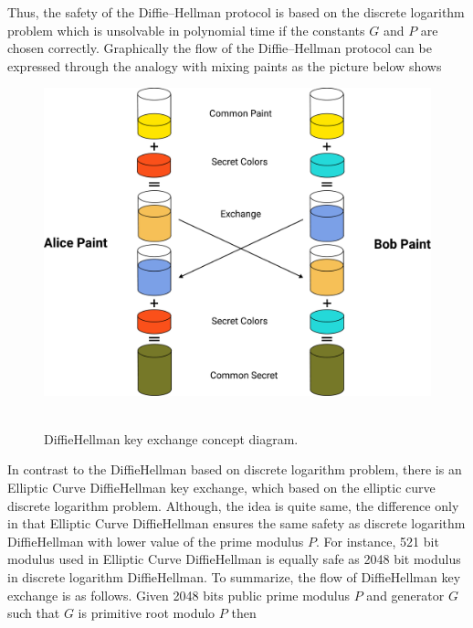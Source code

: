 \documentclass[12pt,letterpaper,oneside,reqno]{amsart}
\numberwithin{equation}{section}
\begin{document}
    Thus, the safety of the Diffie--Hellman protocol is based on the discrete logarithm problem which is unsolvable
    in polynomial time if the constants $G$ and $P$ are chosen correctly.
    Graphically the flow of the Diffie--Hellman protocol can be expressed through the
    analogy with mixing paints as the picture below shows
    \begin{figure}[H]
        \centering
        \includegraphics[width=1\textwidth]{Pictures/Diffie_Hellman_keyexchange_concept_diagram}
        ~\caption{Diffie\textendash Hellman key exchange concept diagram.}\label{fig:figure4}
    \end{figure}
    In contrast to the Diffie\textendash Hellman based on discrete logarithm problem, there is an Elliptic Curve Diffie\textendash Hellman
    key exchange, which based on the elliptic curve discrete logarithm problem.
    Although, the idea is quite same, the difference only in that Elliptic Curve Diffie\textendash Hellman ensures the same safety
    as discrete logarithm Diffie\textendash Hellman with lower value of the prime modulus $P$.
    For instance, 521 bit modulus used in Elliptic Curve Diffie\textendash Hellman is equally safe as 2048 bit modulus in
    discrete logarithm Diffie\textendash Hellman.
    To summarize, the flow of Diffie\textendash Hellman key exchange is as follows.
    Given 2048 bits public prime modulus $P$ and generator $G$ such that $G$ is primitive root modulo $P$ then
\end{document}
